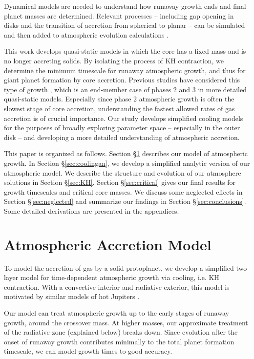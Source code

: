 \documentclass[apj, numberedappendix]{emulateapj}
\begin{document}
Dynamical models are needed to understand how runaway growth ends and final planet masses are determined.  Relevant processes -- including gap opening in disks and the transition of accretion from spherical to planar -- can be simulated and then added to atmospheric evolution calculations \citep{LisHub09}.

This work develops quasi-static models in which the core has a fixed mass and is no longer accreting solids.  By isolating the process of KH contraction, we determine the minimum timescale for runaway atmospheric growth, and thus for giant planet formation by core accretion.  Previous studies have considered this type of growth \citep{ikoma00, pn05}, which is an end-member case of phases 2 and 3 in more detailed quasi-static models.  Especially since phase 2 atmospheric growth is often the slowest stage of core accretion, understanding the fastest allowed rates of gas accretion is of crucial importance.  Our study develops simplified cooling models for the purposes of broadly exploring parameter space -- especially in the outer disk -- and developing a more detailed understanding of atmospheric accretion.

This paper is organized as follows. Section \S\ref{sec:model} describes our model of atmospheric growth.  In Section \S\ref{sec:coolingan}, we develop a simplified analytic version of our atmospheric model.  We describe the structure and evolution of our atmosphere solutions in Section \S\ref{sec:KH}.   Section \S\ref{sec:critical} gives our final results for growth timescales and critical core masses.  We discuss some neglected effects in Section \S\ref{sec:neglected} and summarize our findings in Section \S\ref{sec:conclusions}.  Some detailed derivations are presented in the appendices.


\section{Atmospheric Accretion Model} \label{sec:model}

To model the accretion of gas by a solid protoplanet, we develop a simplified two-layer model for time-dependent atmospheric growth via cooling, i.e. KH contraction.  With a convective interior and radiative exterior, this model is motivated by similar models of hot Jupiters \citep{ab06, ym10}. 

Our model can  treat atmospheric growth up to the early stages of runaway growth, around the crossover mass.  At higher masses, our approximate treatment of the radiative zone (explained below) breaks down.   Since evolution after the onset of runaway growth contributes minimally to the total planet formation timescale, we can model growth times to good accuracy. 
\end{document}
